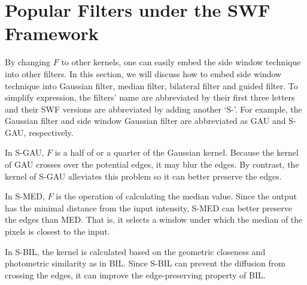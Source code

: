 \documentclass[10pt,twocolumn,letterpaper]{article}
\begin{document}
\section{Popular Filters under the SWF Framework}
By changing $F$ to other kernels, one can easily embed the side window technique into other filters. In this section, we will discuss how to embed side window technique into Gaussian filter, median filter, bilateral filter and guided filter. To simplify expression, the filters' name are abbreviated by their first three letters and their SWF versions are abbreviated by adding another `S-'. For example, the Gaussian filter and side window Gaussian filter are abbreviated as GAU and S-GAU, respectively. 

In S-GAU, $F$ is a half of or a quarter of the  Gaussian kernel. Because the kernel of GAU crosses over the potential edges, it may blur the edges. By contrast, the kernel of S-GAU alleviates this problem so it can better preserve the edges.

In S-MED, $F$ is the operation of calculating the median value. Since the output has the minimal distance from the input intensity, S-MED can better preserve the edges than MED. That is, it selects a window under which the median of the pixels is closest to the input. 

In S-BIL, the kernel is calculated based on the geometric closeness and photometric similarity as in BIL. Since S-BIL can prevent the diffusion from crossing the edges, it can improve the edge-preserving property of BIL. 
\end{document}
